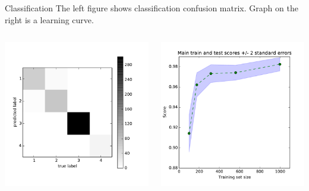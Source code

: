 \documentclass[final,hyperref={pdfpagelabels=false}]{beamer}
\begin{document}
\begin{frame}[t]
\begin{columns}[t]
\begin{column}{.465\textwidth}
\begin{block}{Classification}
The left figure shows classification confusion matrix. Graph on the right is a learning curve.


\begin{columns} %
\begin{column}{.4\textwidth} %
\includegraphics[width=1\linewidth]{confusion}
\end{column}
\begin{column}{.4\textwidth}
\includegraphics[width=1\linewidth]{learning}
\end{column}
\end{columns} %
\end{block}



\end{column}
\end{columns}
\end{frame}
\end{document}
